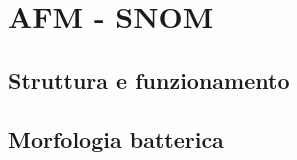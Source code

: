 \documentclass[../main.tex]{subfiles}
\begin{document}
\chapter{AFM - SNOM}
\section{Struttura e funzionamento}
\section{Morfologia batterica}
\end{document}
